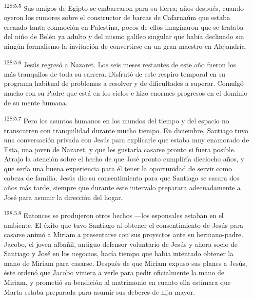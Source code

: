 \par
\textsuperscript{128:5.5} Sus amigos de Egipto se embarcaron para su tierra; años después, cuando oyeron los rumores sobre el constructor de barcas de Cafarnaúm que estaba creando tanta conmoción en Palestina, pocos de ellos imaginaron que se trataba del niño de Belén ya adulto y del mismo galileo singular que había declinado sin ningún formalismo la invitación de convertirse en un gran maestro en Alejandría.

\par
\textsuperscript{128:5.6} Jesús regresó a Nazaret. Los seis meses restantes de este año fueron los más tranquilos de toda su carrera. Disfrutó de este respiro temporal en su programa habitual de problemas a resolver y de dificultades a superar. Comulgó mucho con su Padre que está en los cielos e hizo enormes progresos en el dominio de su mente humana.

\par
\textsuperscript{128:5.7} Pero los asuntos humanos en los mundos del tiempo y del espacio no transcurren con tranquilidad durante mucho tiempo. En diciembre, Santiago tuvo una conversación privada con Jesús para explicarle que estaba muy enamorado de Esta, una joven de Nazaret, y que les gustaría casarse pronto si fuera posible. Atrajo la atención sobre el hecho de que José pronto cumpliría dieciocho años, y que sería una buena experiencia para él tener la oportunidad de servir como cabeza de familia. Jesús dio su consentimiento para que Santiago se casara dos años más tarde, siempre que durante este intervalo preparara adecuadamente a José para asumir la dirección del hogar.

\par
\textsuperscript{128:5.8} Entonces se produjeron otros hechos ---los esponsales estaban en el ambiente. El éxito que tuvo Santiago al obtener el consentimiento de Jesús para casarse animó a Miriam a presentarse con sus proyectos ante su hermano-padre. Jacobo, el joven albañil, antiguo defensor voluntario de Jesús y ahora socio de Santiago y José en los negocios, hacía tiempo que había intentado obtener la mano de Miriam para casarse. Después de que Miriam expuso sus planes a Jesús, éste ordenó que Jacobo viniera a verle para pedir oficialmente la mano de Miriam, y prometió su bendición al matrimonio en cuanto ella estimara que Marta estaba preparada para asumir sus deberes de hija mayor.

